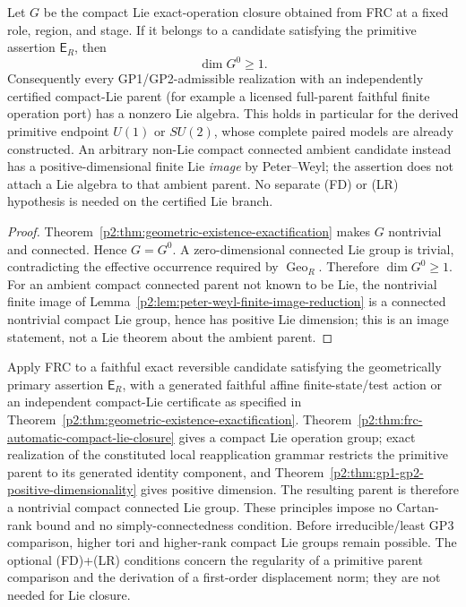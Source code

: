 \documentclass[12pt,a4paper]{article}
\begin{document}
\begin{theorem}
\label{p2:thm:gp1-gp2-positive-dimensionality}
Let \(G\) be the compact Lie exact-operation closure obtained from FRC at a
fixed role, region, and stage.  If it belongs to a candidate satisfying the
primitive assertion \(\mathsf E_R\), then
\[
        \dim G^0\ge1.
\]
Consequently every GP1/GP2-admissible realization with an independently
certified compact-Lie parent (for example a licensed full-parent faithful
finite operation port) has a nonzero Lie algebra.  This holds in particular
for the derived primitive endpoint \(U(1)\) or \(SU(2)\), whose complete
paired models are already constructed.  An arbitrary non-Lie compact
connected ambient candidate instead has a positive-dimensional finite Lie
\emph{image} by Peter--Weyl; the assertion does not attach a Lie algebra
to that ambient parent.  No separate (FD) or (LR) hypothesis is needed
on the certified Lie branch.
\end{theorem}

\begin{proof}
Theorem~\ref{p2:thm:geometric-existence-exactification} makes \(G\)
nontrivial and connected.  Hence \(G=G^0\).  A zero-dimensional connected Lie
group is trivial, contradicting the effective occurrence required by
\(\operatorname{Geo}_R\).  Therefore \(\dim G^0\ge1\).
For an ambient compact connected parent not known to be Lie, the
nontrivial finite image of
Lemma~\ref{p2:lem:peter-weyl-finite-image-reduction} is a connected
nontrivial compact Lie group, hence has positive Lie dimension; this is
an image statement, not a Lie theorem about the ambient parent.
\end{proof}

\begin{theorem}
\label{p2:thm:gp1-gp2-compact-natural-alternatives}
Apply FRC to a faithful exact reversible candidate satisfying the
geometrically primary assertion \(\mathsf E_R\), with a generated
faithful affine finite-state/test action or an independent compact-Lie
certificate as specified in
Theorem~\ref{p2:thm:geometric-existence-exactification}.
Theorem~\ref{p2:thm:frc-automatic-compact-lie-closure}
gives a compact Lie operation group; exact realization of the constituted
local reapplication grammar restricts the primitive parent to its generated
identity component, and
Theorem~\ref{p2:thm:gp1-gp2-positive-dimensionality} gives positive dimension.
The resulting parent is therefore a nontrivial compact connected Lie group.
These principles impose no Cartan-rank bound and no simply-connectedness
condition.  Before irreducible/least GP3 comparison, higher tori and
higher-rank compact Lie groups remain possible.  The optional (FD)+(LR)
conditions concern the
regularity of a primitive parent comparison and the derivation of a
first-order displacement norm; they are not needed for Lie closure.
\end{theorem}
\end{document}
